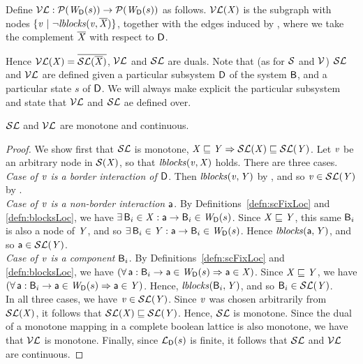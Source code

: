 \begin{definition}[$\lVFs$] \label{defn:violFixLoc}
Define $\lVFs: \lwfgS{B}{s}{\DS}  \to  \lwfgS{B}{s}{\DS}$ as follows.
$\lVF{\XS}$ is the subgraph with nodes $\set{\ndv \stt \neg \lblocks{\ndv}{\compl{\XS}} }$, together with the edges induced by ,
where we take the complement $\compl{\XS}$ with respect to $\DS$.
\end{definition}
%
Hence $\lVF{\XS} = \overline{\lSF{\overline{\XS}}}$, \ie $\lVFs$ and $\lSFs$ are duals.
Note that (as for $\SFs$ and $\VFs$) $\lSFs$ and $\lVFs$ are defined given a particular
subsystem $\DS$ of the system 
$\B$, and a particular state $s$ of $\DS$. We will always make explicit the particular
subsystem and state that $\lVFs$ and $\lSFs$ ae defined over.





\begin{proposition} \label{prop:monotoneLoc}
$\lSFs$ and $\lVFs$ are monotone and continuous.
\end{proposition}
%
\begin{proof}
We show first that $\lSFs$ is monotone, \ie $\XS \subg \YS \imp \lSF{\XS} \subg \lSF{\YS}$.
Let $\ndv$ be an arbitrary node in $\SF{\XS}$, so that $\lblocks{\ndv}{\XS}$ holds. There are three cases.\\

\emph{Case of $\ndv$ is a border interaction of $\DS$}. Then $\lblocks{\ndv}{\YS}$ by , and so $\ndv \in  \lSF{\YS}$ by
.\\

\emph{Case of $\ndv$ is a non-border interaction $\act$}. By Definitions~\ref{defn:scFixLoc} and \ref{defn:blocksLoc}, we have
$\ex \B_i \in \XS  : \act \ar \B_i \in \lwfg{B}{s}{\DS}$.
Since $\XS \subg \YS$, this same $\B_i$ is also a node of $\YS$, and so  $\ex \B_i \in \YS  : \act \ar \B_i \in \lwfg{B}{s}{\DS}$. 
Hence  $\lblocks{\act}{\YS}$, and so $\act \in \lSF{\YS}$. \\

\emph{Case of $\ndv$ is a component $\B_i$}. By Definitions~\ref{defn:scFixLoc} and \ref{defn:blocksLoc}, we have
$(\fa \act : \B_i \ar \act \in \lwfg{\B}{s}{\DS} \imp \act \in \XS)$.
Since $\XS \subg \YS$, we have  $(\fa \act : \B_i \ar \act \in \lwfg{B}{s}{\DS} \imp \act \in \YS)$. 
Hence, $\lblocks{\B_i}{\YS}$, and so $\B_i \in \lSF{\YS}$. \\

In all three cases, we have $\ndv \in \lSF{\YS}$. Since $\ndv$ was chosen arbitrarily from $\lSF{\XS} $, it follows that $\lSF{\XS} \subg \lSF{\YS}$. Hence, $\lSFs$ is monotone.
%
Since the dual of a monotone mapping in a complete boolean lattice is also monotone, we have that $\lVFs$ is monotone.
%
Finally, since $\llat{\B}{s}{\DS}$ is finite, it follows that $\lSFs$ and $\lVFs$ are continuous.
\end{proof}




